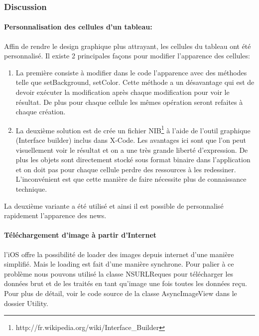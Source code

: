 			\subsubsection*{Discussion}
			
			
			\paragraph{Personnalisation des cellules d'un tableau:}Affin de rendre le design graphique plus attrayant, les cellules du tableau  ont été personnalisé. Il existe 2 principales façons pour modifier l'apparence des cellules:
		 	\begin{enumerate}
		 	\item La première consiste à modifier dans le code l'apparence avec des méthodes telle que setBackground, setColor. Cette méthode a un désavantage qui est de devoir exécuter la modification après chaque modification pour voir le résultat. De plus pour chaque cellule les mêmes opération seront refaites à chaque création.
		 	\item La deuxième solution est de crée un fichier NIB\footnote{http://fr.wikipedia.org/wiki/Interface\_Builder} à l'aide de l'outil graphique (Interface builder) inclus dans X-Code. Les avantages ici sont que l'on peut visuellement voir le résultat et on a une très grande liberté d'expression. De plus les objets sont directement stocké sous format binaire dans l'application et on doit pas pour chaque cellule perdre des ressources à les redessiner. L'inconvénient est que cette manière de faire nécessite plus de connaissance technique. 
		 	\end{enumerate}
			La deuxième variante a été utilisé et ainsi il est possible de personnalisé rapidement l'apparence des news.
			
			\paragraph{Téléchargement d'image à partir d'Internet} l'iOS offre la possibilité de loader des images depuis internet d'une manière simplifié. Mais le loading est fait d'une manière synchrone. Pour palier à ce problème nous pouvons utilisé la classe NSURLReques pour télécharger les données brut et de les traités en tant qu'image une fois toutes les données reçu. Pour plus de détail, voir le code source de la classe AsyncImageView dans le dossier Utility. 
			
